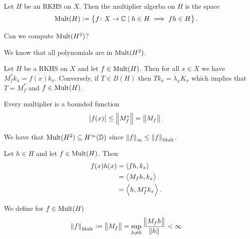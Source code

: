 \documentclass[11pt,a4paper]{article}
\begin{document}

\begin{definition}
  Let $H$ be an RKHS on $X$.
  Then the multiplier algerba on $H$ is the space
  \[
    \operatorname{Mult}(H) :=
    \left\{f \colon X \to \mathbb{C} \mid h \in H \implies f h \in H\right\}.
  \]
\end{definition}


\begin{question}
  Can we compute $\operatorname{Mult}(H^2)$?
\end{question}
\begin{answer}
  We know that all polynomials are in $\operatorname{Mult}(H^2)$.
\end{answer}

\begin{proposition}
  \label{prop:temp}
  Let $H$ be a RKHS on $X$ and let $f \in \operatorname{Mult}(H)$.
  Then for all $x \in X$ we have $M_f^* k_x = \overline{f(x)} k_x$.
  Conversely, if $T \in B(H)$ then
  $T k_x = \lambda_x K_x$ which implies that $T = M_f^*$
  and $f \in \operatorname{Mult}(H)$.
\end{proposition}

\begin{corollary}
  Every multiplier is a bounded function
  \[
    \left\lvert f(x)\right\rvert \le \left\lVert M_f^*\right\rVert = \left\lVert M_f\right\rVert.
  \]
\end{corollary}
\begin{corollary}
  We have that $\operatorname{Mult}(H^2) \subseteq H^{\infty}(\mathbb{D})$
  since $\left\lVert f\right\rVert_{\infty} \le \left\lVert f\right\rVert_{\operatorname{Mult}}$.
\end{corollary}

\begin{proofof}{}
  Let $h \in H$ and let $f \in \operatorname{Mult}(H)$.
  Then
  \begin{align*}
    f(x) h(x) &= \left\langle fh, k_x \right\rangle \\
              &= \left\langle M_f h, k_x \right\rangle \\
              &= \left\langle h, M_f^* k_x \right\rangle.
  \end{align*}
\end{proofof}


\begin{definition}
  We define for $f \in \operatorname{Mult}(H)$
  \[
    \left\lVert f\right\rVert_{\operatorname{Mult}} :=
    \left\lVert M_f\right\rVert =
    \sup_{h \neq 0} \frac{\left\lVert M_f h\right\rVert}{\left\lVert h\right\rVert} < \infty
  \]
\end{definition}
\end{document}
